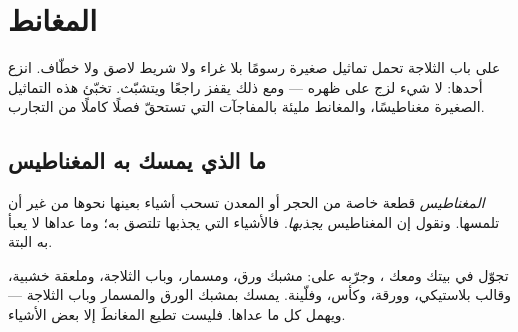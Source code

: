 \chapter{المغانط}\label{ch:g1:magnets}

على باب الثلاجة تحمل تماثيل صغيرة رسومًا بلا غراء ولا شريط لاصق
ولا خطّاف. انزع أحدها: لا شيء لزج على ظهره --- ومع ذلك يقفز راجعًا
ويتشبّث. تخبّئ هذه التماثيل الصغيرة مغناطيسًا، والمغانط مليئة
بالمفاجآت التي تستحقّ فصلًا كاملًا من التجارب.

\section{ما الذي يمسك به المغناطيس}

\begin{definition}[المغانط]\label{def:g1:magnets:magnet}
\emph{المغناطيس} قطعة خاصة من الحجر أو المعدن تسحب
أشياء بعينها نحوها من غير أن تلمسها. ونقول إن المغناطيس
\emph{يجذبها}. فالأشياء التي يجذبها تلتصق به؛ وما عداها
لا يعبأ به البتة.
\end{definition}

\begin{example}\label{ex:g1:magnets:test}
تجوّل في بيتك ومعك ، وجرّبه على: مشبك ورق، ومسمار، وباب
الثلاجة، وملعقة خشبية، وقالب بلاستيكي، وورقة، وكأس، وفلّينة. يمسك
 بمشبك الورق والمسمار وباب الثلاجة --- ويهمل كل ما عداها.
فليست تطيع المغانطَ إلا بعض الأشياء.
\end{example}

